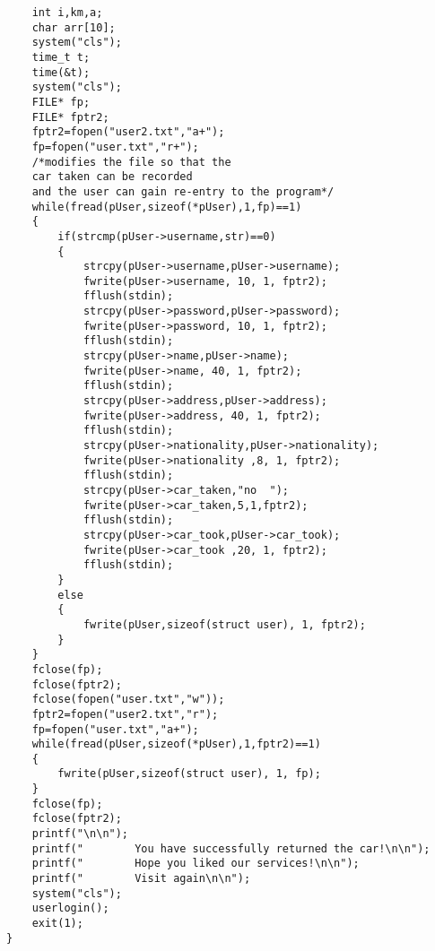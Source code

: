 \documentclass[12pt]{article}
\begin{document}
\begin{lstlisting}
    int i,km,a;
    char arr[10];
    system("cls");
    time_t t;
    time(&t);
    system("cls");
    FILE* fp;
    FILE* fptr2;
    fptr2=fopen("user2.txt","a+");
    fp=fopen("user.txt","r+");
    /*modifies the file so that the
    car taken can be recorded
    and the user can gain re-entry to the program*/
    while(fread(pUser,sizeof(*pUser),1,fp)==1)
    {
        if(strcmp(pUser->username,str)==0)
        {
            strcpy(pUser->username,pUser->username);
            fwrite(pUser->username, 10, 1, fptr2);
            fflush(stdin);
            strcpy(pUser->password,pUser->password);
            fwrite(pUser->password, 10, 1, fptr2);
            fflush(stdin);
            strcpy(pUser->name,pUser->name);
            fwrite(pUser->name, 40, 1, fptr2);
            fflush(stdin);
            strcpy(pUser->address,pUser->address);
            fwrite(pUser->address, 40, 1, fptr2);
            fflush(stdin);
            strcpy(pUser->nationality,pUser->nationality);
            fwrite(pUser->nationality ,8, 1, fptr2);
            fflush(stdin);
            strcpy(pUser->car_taken,"no  ");
            fwrite(pUser->car_taken,5,1,fptr2);
            fflush(stdin);
            strcpy(pUser->car_took,pUser->car_took);
            fwrite(pUser->car_took ,20, 1, fptr2);
            fflush(stdin);
        }
        else
        {
            fwrite(pUser,sizeof(struct user), 1, fptr2);
        }
    }
    fclose(fp);
    fclose(fptr2);
    fclose(fopen("user.txt","w"));
    fptr2=fopen("user2.txt","r");
    fp=fopen("user.txt","a+");
    while(fread(pUser,sizeof(*pUser),1,fptr2)==1)
    {
        fwrite(pUser,sizeof(struct user), 1, fp);
    }
    fclose(fp);
    fclose(fptr2);
    printf("\n\n");
    printf("        You have successfully returned the car!\n\n");
    printf("        Hope you liked our services!\n\n");
    printf("        Visit again\n\n");
    system("cls");
    userlogin();
    exit(1);
}


\end{lstlisting}
\end{document}
